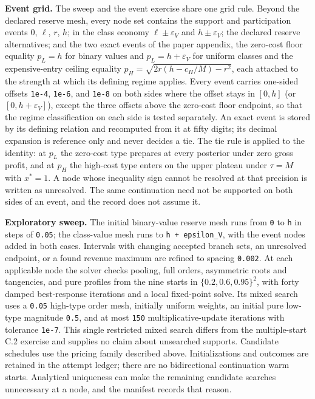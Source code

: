 \documentclass[
  11pt,
]{article}
\begin{document}
\textbf{Event grid.} The sweep and the event exercise share one grid
rule. Beyond the declared reserve mesh, every node set contains the
support and participation events \(0\), \(\ell\), \(r\), \(h\); in the
class economy \(\ell\pm\varepsilon_V\) and \(h\pm\varepsilon_V\); the
declared reserve alternatives; and the two exact events of the paper
appendix, the zero-cost floor equality \(p_L=h\) for binary values and
\(p_L=h+\varepsilon_V\) for uniform classes and the expensive-entry
ceiling equality \(p_H=\sqrt{2r(h-c_H/M)-r^2}\), each attached to the
strength at which its defining regime applies. Every event carries
one-sided offsets \texttt{1e-4}, \texttt{1e-6}, and \texttt{1e-8} on
both sides where the offset stays in \([0,h]\) (or
\([0,h+\varepsilon_V]\)), except the three offsets above the zero-cost
floor endpoint, so that the regime classification on each side is tested
separately. An exact event is stored by its defining relation and
recomputed from it at fifty digits; its decimal expansion is reference
only and never decides a tie. The tie rule is applied to the identity:
at \(p_L\) the zero-cost type prepares at every posterior under zero
gross profit, and at \(p_H\) the high-cost type enters on the upper
plateau under \(\tau=M\) with \(x^*=1\). A node whose inequality sign
cannot be resolved at that precision is written as unresolved. The same
continuation need not be supported on both sides of an event, and the
record does not assume it.

\textbf{Exploratory sweep.} The initial binary-value reserve mesh runs
from \texttt{0} to \texttt{h} in steps of \texttt{0.05}; the class-value
mesh runs to \texttt{h\ +\ epsilon\_V}, with the event nodes added in
both cases. Intervals with changing accepted branch sets, an unresolved
endpoint, or a found revenue maximum are refined to spacing
\texttt{0.002}. At each applicable node the solver checks pooling, full
orders, asymmetric roots and tangencies, and pure profiles from the nine
starts in \(\{0.2,0.6,0.95\}^2\), with forty damped best-response
iterations and a local fixed-point solve. Its mixed search uses a
\texttt{0.05} high-type order mesh, initially uniform weights, an
initial pure low-type magnitude \texttt{0.5}, and at most \texttt{150}
multiplicative-update iterations with tolerance \texttt{1e-7}. This
single restricted mixed search differs from the multiple-start C.2
exercise and supplies no claim about unsearched supports. Candidate
schedules use the pricing family described above. Initializations and
outcomes are retained in the attempt ledger; there are no bidirectional
continuation warm starts. Analytical uniqueness can make the remaining
candidate searches unnecessary at a node, and the manifest records that
reason.
\end{document}
